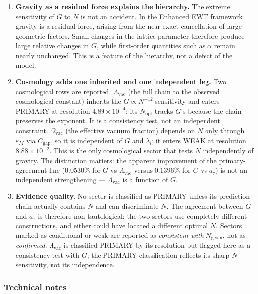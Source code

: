 \documentclass[10pt,a4paper]{article}
\begin{document}
\begin{enumerate}
	\item \textbf{Gravity as a residual force explains the hierarchy.}
	The extreme sensitivity of $G$ to $N$ is not an accident. In the
	Enhanced EWT framework gravity is a residual force, arising from the
	near-exact cancellation of large geometric factors. Small changes in
	the lattice parameter therefore produce large relative changes in $G$,
	while first-order quantities such as $\alpha$ remain nearly unchanged.
	This is a feature of the hierarchy, not a defect of the model.
	
	\item \textbf{Cosmology adds one inherited and one independent leg.}
	Two cosmological rows are reported. $\Lambda_{\text{vac}}$ (the full
	chain to the observed cosmological constant) inherits the
	$G \propto N^{-12}$ sensitivity and enters PRIMARY at resolution
	$4.89 \times 10^{-4}$; its $N_{\text{opt}}$ tracks $G$'s because the
	chain preserves the exponent. It is a consistency test, not an
	independent constraint. $\Omega_{\text{vac}}$ (the effective vacuum
	fraction) depends on $N$ only through $\varepsilon_M$ via
	$C_{\text{gap}}$, so it is independent of $G$ and $\lambda_l$; it
	enters WEAK at resolution $8.88 \times 10^{-2}$. This is the only
	cosmological sector that tests $N$ independently of gravity. The
	distinction matters: the apparent improvement of the primary-agreement
	line ($0.0530\%$ for $G$ vs $\Lambda_{\text{vac}}$ versus $0.1396\%$
	for $G$ vs $a_\tau$) is not an independent strengthening ---
	$\Lambda_{\text{vac}}$ is a function of $G$.
	
	\item \textbf{Evidence quality.}
	No sector is classified as PRIMARY unless its prediction chain
	actually contains $N$ and can discriminate $N$. The agreement between
	$G$ and $a_\tau$ is therefore non-tautological: the two sectors use
	completely different constructions, and either could have located a
	different optimal $N$. Sectors marked as conditional or weak are
	reported as \emph{consistent with} $N_{\text{geom}}$, not as
	\emph{confirmed}. $\Lambda_{\text{vac}}$ is classified PRIMARY by its
	resolution but flagged here as a consistency test with $G$; the
	PRIMARY classification reflects its sharp $N$-sensitivity, not its
	independence.
\end{enumerate}

\subsubsection{Technical notes}
\end{document}
